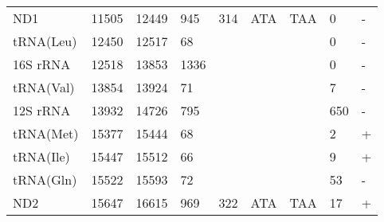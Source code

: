 \documentclass[../DISSERTACAO_MAIN.tex]{subfiles}
\begin{document}
\begin{longtable}{llllllllllllllllllllll}
			ND1          & 11505          & \multicolumn{2}{l}{12449} & \multicolumn{2}{l}{945}        & \multicolumn{3}{l}{314}                       & \multicolumn{3}{l}{ATA}           & \multicolumn{3}{l}{TAA}   & \multicolumn{3}{l}{0}           & \multicolumn{4}{l}{-}                  \\
			tRNA(Leu)    & 12450          & \multicolumn{2}{l}{12517} & \multicolumn{2}{l}{68}         & \multicolumn{3}{l}{}                          & \multicolumn{3}{l}{}              & \multicolumn{3}{l}{}      & \multicolumn{3}{l}{0}           & \multicolumn{4}{l}{-}                  \\
			16S 				rRNA & 12518          & \multicolumn{2}{l}{13853} & \multicolumn{2}{l}{1336}       & \multicolumn{3}{l}{}                          & \multicolumn{3}{l}{}              & \multicolumn{3}{l}{}      & \multicolumn{3}{l}{0}           & \multicolumn{4}{l}{-}                  \\
			tRNA(Val)    & 13854          & \multicolumn{2}{l}{13924} & \multicolumn{2}{l}{71}         & \multicolumn{3}{l}{}                          & \multicolumn{3}{l}{}              & \multicolumn{3}{l}{}      & \multicolumn{3}{l}{7}           & \multicolumn{4}{l}{-}                  \\
			12S 				rRNA & 13932          & \multicolumn{2}{l}{14726} & \multicolumn{2}{l}{795}        & \multicolumn{3}{l}{}                          & \multicolumn{3}{l}{}              & \multicolumn{3}{l}{}      & \multicolumn{3}{l}{650}         & \multicolumn{4}{l}{-}                  \\
			tRNA(Met)    & 15377          & \multicolumn{2}{l}{15444} & \multicolumn{2}{l}{68}         & \multicolumn{3}{l}{}                          & \multicolumn{3}{l}{}              & \multicolumn{3}{l}{}      & \multicolumn{3}{l}{2}           & \multicolumn{4}{l}{+}                  \\
			tRNA(Ile)    & 15447          & \multicolumn{2}{l}{15512} & \multicolumn{2}{l}{66}         & \multicolumn{3}{l}{}                          & \multicolumn{3}{l}{}              & \multicolumn{3}{l}{}      & \multicolumn{3}{l}{9}           & \multicolumn{4}{l}{+}                  \\
			tRNA(Gln)    & 15522          & \multicolumn{2}{l}{15593} & \multicolumn{2}{l}{72}         & \multicolumn{3}{l}{}                          & \multicolumn{3}{l}{}              & \multicolumn{3}{l}{}      & \multicolumn{3}{l}{53}          & \multicolumn{4}{l}{-}                  \\
			ND2          & 15647          & \multicolumn{2}{l}{16615} & \multicolumn{2}{l}{969}        & \multicolumn{3}{l}{322}                       & \multicolumn{3}{l}{ATA}           & \multicolumn{3}{l}{TAA}   & \multicolumn{3}{l}{17}          & \multicolumn{4}{l}{+}                  \\

\end{longtable}
\end{document}
